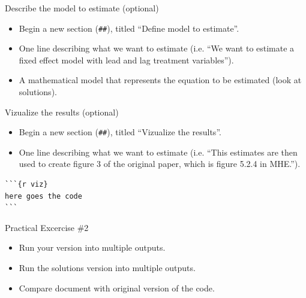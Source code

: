 \documentclass[ignorenonframetext,]{beamer}
\providecommand{\tightlist}{%
  \setlength{\itemsep}{0pt}\setlength{\parskip}{0pt}}
\begin{document}
\begin{frame}[fragile]{Describe the model to estimate (optional)}
\protect\hypertarget{describe-the-model-to-estimate-optional}{}

\begin{itemize}
\tightlist
\item
  Begin a new section (\texttt{\#\#}), titled ``Define model to
  estimate''.\\
\item
  One line describing what we want to estimate (i.e. ``We want to
  estimate a fixed effect model with lead and lag treatment
  variables'').\\
\item
  A mathematical model that represents the equation to be estimated
  (look at solutions).
\end{itemize}

\end{frame}

\begin{frame}[fragile]{Vizualize the results (optional)}
\protect\hypertarget{vizualize-the-results-optional}{}

\begin{itemize}
\tightlist
\item
  Begin a new section (\texttt{\#\#}), titled ``Vizualize the
  results''.\\
\item
  One line describing what we want to estimate (i.e. ``This estimates
  are then used to create figure 3 of the original paper, which is
  figure 5.2.4 in MHE.'').\\
\end{itemize}

\begin{verbatim}
```{r viz}
here goes the code
```
\end{verbatim}

\end{frame}

\begin{frame}{Practical Excercise \#2}
\protect\hypertarget{practical-excercise-2-1}{}

\begin{itemize}
\tightlist
\item
  Run your version into multiple outputs.\\
\item
  Run the solutions version into multiple outputs.\\
\item
  Compare document with original version of the code.
\end{itemize}

\end{frame}
\end{document}
